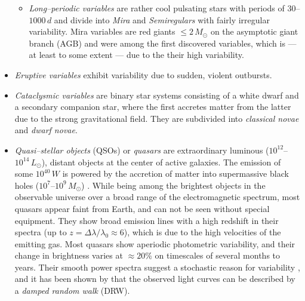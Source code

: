 \begin{itemize}
\begin{itemize}[label=$\circ$]
	\item \emph{Long--periodic variables} are rather cool pulsating stars with periods of $30$--$1000 \, \unit{d}$ and divide into \emph{Mira} and \emph{Semiregulars} with fairly irregular variability. Mira variables are red giants $\le 2 \, \unit{M_\odot}$ on the asymptotic giant branch (AGB) \citep{unsoeld2001} and were among the first discovered variables, which is --- at least to some extent --- due to the their high variability.
	\end{itemize}

\item \emph{Eruptive variables} exhibit variability due to sudden, violent outbursts.
\item \emph{Cataclysmic variables} are binary star systems consisting of a white dwarf and a secondary companion star, where the first accretes matter from the latter due to the strong gravitational field. They are subdivided into \emph{classical novae} and \emph{dwarf novae}.


\item \emph{Quasi--stellar objects} (QSOs) or \emph{quasars} are extraordinary luminous ($10^{12}$--$10^{14} \, \unit{L_\odot}$), distant objects at the center of active galaxies. The emission of some $10^{40} \, \unit{W}$ is powered by the accretion of matter into supermassive black holes ($10^7$--$10^9 \, \unit{M_\odot}$) \citep{hanslmeier2007}. While being among the brightest objects in the observable universe over a broad range of the electromagnetic spectrum, most quasars appear faint from Earth, and can not be seen without special equipment. They show broad emission lines with a high redshift in their spectra (up to $z  = \Delta \lambda / \lambda_0 \approx 6$), which is due to the high velocities of the emitting gas. Most quasars show aperiodic photometric variability, and their change in brightness varies at $\approx 20\%$ on timescales of several months to years. Their smooth power spectra suggest a stochastic reason for variability \citep{macleod2010}, and it has been shown by \citet{kozlowski2010} that the observed light curves can be described by a \emph{damped random walk} (DRW).


\end{itemize}

